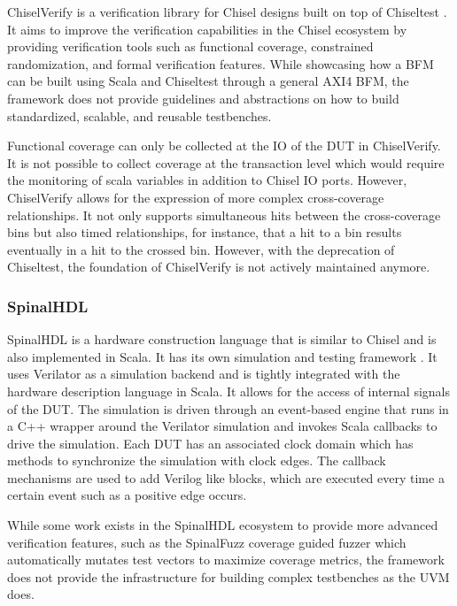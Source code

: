ChiselVerify is a verification library for Chisel designs built on top of Chiseltest \cite{chiselverify}. It aims to
improve the verification capabilities in the Chisel ecosystem by providing verification tools such as functional
coverage, constrained randomization, and formal verification features. While showcasing how a BFM can be built using
Scala and Chiseltest through a general AXI4 BFM, the framework does not provide guidelines and abstractions on how to build standardized, scalable, and reusable testbenches.

Functional coverage can only be collected at the IO of the DUT in ChiselVerify. It is not possible to collect
coverage at the transaction level which would require the monitoring of scala variables in addition to Chisel IO
ports. However, ChiselVerify allows for the expression of more complex cross-coverage relationships. It not only
supports simultaneous hits between the cross-coverage bins but also timed relationships, for instance, that a hit to a bin results eventually in a hit to the crossed bin. However, with the deprecation of Chiseltest, the foundation of ChiselVerify is not actively maintained anymore.

\subsubsection{SpinalHDL}

SpinalHDL is a hardware construction language that is similar to Chisel and is also implemented in Scala. It has its own simulation and testing framework \cite{spinal}. It uses Verilator as a simulation backend and is tightly integrated with the hardware description language in Scala. It allows for the access of internal signals of the DUT. The simulation is driven through an event-based engine that runs in a C++ wrapper around the Verilator simulation and invokes Scala callbacks to drive the simulation. Each DUT has an associated clock domain which has methods to synchronize the simulation with clock edges. The callback mechanisms are used to add Verilog  like blocks, which are executed every time a certain event such as a positive edge occurs.

While some work exists in the SpinalHDL ecosystem to provide more advanced verification features, such as the SpinalFuzz coverage guided fuzzer \cite{ruep2022spinalfuzz} which automatically mutates test vectors to maximize coverage metrics, the framework does not provide the infrastructure for building complex testbenches as the UVM does.


